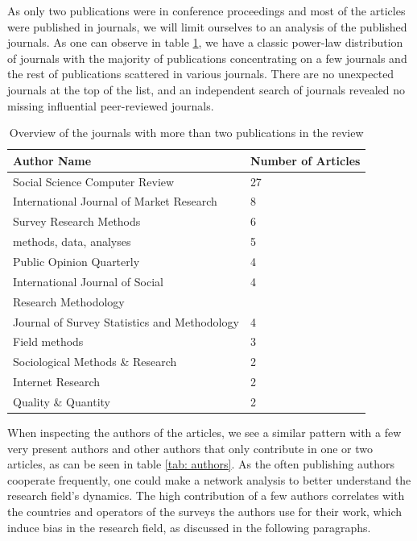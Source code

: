 As only two publications were in conference proceedings and most of the articles were published in journals, we will limit ourselves to an analysis of the published journals. As one can observe in table \ref{tab: journals}, we have a classic power-law distribution of journals with the majority of publications concentrating on a few journals and the rest of publications scattered in various journals. There are no unexpected journals at the top of the list, and an independent search of journals revealed no missing influential peer-reviewed journals. 

\begin{table}
	\centering
	\begin{tabular}{ll}
		\toprule
		Author Name & Number of Articles \\
		\midrule
        Social Science Computer Review & 27\\
        International Journal of Market Research & 8\\
        Survey Research Methods& 6\\
        methods, data, analyses & 5\\
        Public Opinion Quarterly & 4\\
        International Journal of Social & 4 \\
        Research Methodology & \\
        Journal of Survey Statistics and Methodology & 4\\
        Field methods & 3\\
        Sociological Methods \& Research & 2\\
        Internet Research & 2 \\
        Quality \& Quantity  & 2\\
		\bottomrule 
	\end{tabular}
	\caption{Overview of the journals with more than two publications in the review}
	\label{tab: journals}
\end{table}

When inspecting the authors of the articles, we see a similar pattern with a few very present authors and other authors that only contribute in one or two articles, as can be seen in table \ref{tab: authors}. As the often publishing authors cooperate frequently, one could make a network analysis to better understand the research field's dynamics. The high contribution of a few authors correlates with the countries and operators of the surveys the authors use for their work, which induce bias in the research field, as discussed in the following paragraphs.

